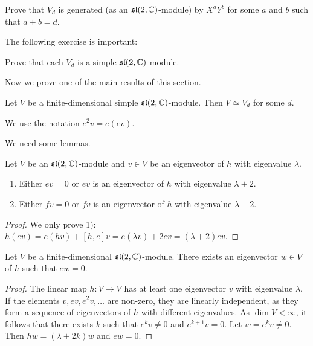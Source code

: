 \begin{exercise}
    Prove that $V_d$ is generated (as an $\mathfrak{sl}(2,\mathbb{C})$-module) by
    $X^aY^b$ for some $a$ and $b$ such that $a+b=d$. 
\end{exercise}

The following exercise is important:

\begin{exercise}
    Prove that each $V_d$ is a simple $\mathfrak{sl}(2,\mathbb{C})$-module.
\end{exercise}

Now we prove one of the main results of this section. 

\begin{theorem}
\label{thm:irreducibles_sl2}
    Let $V$ be a finite-dimensional 
    simple $\mathfrak{sl}(2,\mathbb{C})$-module. Then $V\simeq V_d$ for some $d$. 
\end{theorem}

We use the notation $e^2v=e(ev)$.

We need some lemmas. 

\begin{lemma}
    Let $V$ be an $\mathfrak{sl}(2,\mathbb{C})$-module and $v\in V$ be 
    an eigenvector of $h$ with eigenvalue $\lambda$. 
    \begin{enumerate}
        \item Either $ev=0$ or $ev$ is an eigenvector of $h$ with
            eigenvalue $\lambda+2$.
        \item Either $fv=0$ or $fv$ is an eigenvector of $h$ with
            eigenvalue $\lambda-2$.
    \end{enumerate} 
\end{lemma}

\begin{proof}
    We only prove 1): $h(ev)=e(hv)+[h,e]v=e(\lambda v)+2ev=(\lambda+2)ev$.
\end{proof}

\begin{lemma}
    Let $V$ be a finite-dimensional $\mathfrak{sl}(2,\mathbb{C})$-module.
    There exists an eigenvector $w\in V$ of $h$ such that $ew=0$. 
\end{lemma}

\begin{proof}
    The linear map $h\colon V\to V$ has at least one eigenvector 
    $v$ with eigenvalue $\lambda$. If the elements 
    $v,ev,e^2v,\dots$ are non-zero, they are linearly independent, as they 
    form a sequence of eigenvectors of $h$ with different eigenvalues.  
    As $\dim V<\infty$, it follows that there exists $k$ 
    such that $e^kv\ne 0$ and $e^{k+1}v=0$. Let $w=e^kv\ne 0$. 
    Then
    $hw=(\lambda+2k)w$ and $ew=0$. 
\end{proof}

